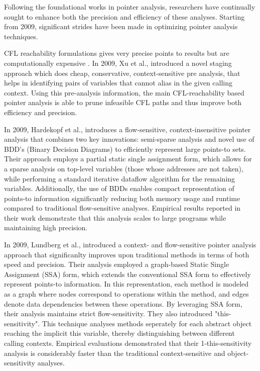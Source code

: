 Following the foundational works in pointer analysis, researchers have continually sought to enhance both the precision and efficiency of these analyses.
Starting from 2009, significant strides have been made in optimizing pointer analysis techniques.

CFL reachability formulations gives very precise points to results but are computationally expensive \cite{xu2009scaling}. 
In 2009, Xu et al., \cite{xu2009scaling} introduced a novel staging approach which does cheap, conservative, context-sensitive pre analysis, that helps in identifying pairs of variables that cannot alias in the given calling context.
Using this pre-analysis information, the main CFL-reachability based pointer analysis is able to prune infeasible CFL paths and thus improve both efficiency and precision.

In 2009, Hardekopf et al., \cite{hardekopf2009semi} introduces a flow-sensitive, context-insensitive pointer analysis that combines two key innovations: semi-sparse analysis and novel use of BDD's (Binary Decision Diagrams) to efficiently represent large points-to sets.
Their approach employs a partial static single assignment form, which allows for a sparse analysis on top-level variables (those whose addresses are not taken), while performing a standard iterative dataflow algorithm for the remaining variables.
Additionally, the use of BDDs enables compact representation of points-to information \cite{bryant1986graph} significantly reducing both memory usage and runtime compared to traditional flow-sensitive analyses.
Empirical results reported in their work demonstrate that this analysis scales to large programs while maintaining high precision.

In 2009, Lundberg et al., \cite{lundberg2009fast} introduced a context- and flow-sensitive pointer analysis approach that significanlty improves upon traditional methods in terms of both speed and precision.
Their analysis employed a graph-based Static Single Assignment (SSA) form, which extends the conventional SSA form \cite{ssa} to effectively represent points-to information.
In this representation, each method is modeled as a graph where nodes correspond to operations within the method, and edges denote data dependencies between these operations.
By leveraging SSA form, their analysis maintains strict flow-sensitivity.
They also introduced "this-sensitivity". This technique analyses methods seperately for each abstract object reaching the implicit this variable, thereby distinguishing between different calling contexts.
Empirical evaluations demonstrated that their 1-this-sensitivity analysis is considerably faster than the traditional context-sensitive and object-sensitivity analyses.

